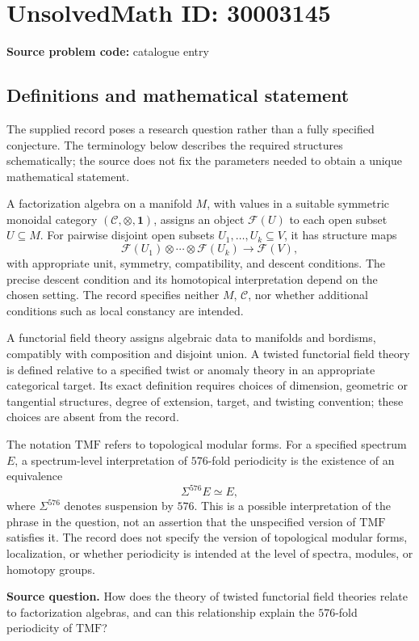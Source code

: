 \documentclass[11pt]{article}
\begin{document}
\section*{UnsolvedMath ID: 30003145}
\textbf{Source problem code:} catalogue entry
\subsection{Definitions and mathematical statement}
The supplied record poses a research question rather than a fully specified conjecture. The terminology below describes the required structures schematically; the source does not fix the parameters needed to obtain a unique mathematical statement.

A factorization algebra on a manifold \(M\), with values in a suitable symmetric monoidal category \((\mathcal C,\otimes,\mathbf 1)\), assigns an object \(\mathcal F(U)\) to each open subset \(U\subseteq M\). For pairwise disjoint open subsets \(U_1,\ldots,U_k\subseteq V\), it has structure maps
\[
\mathcal F(U_1)\otimes\cdots\otimes\mathcal F(U_k)\longrightarrow\mathcal F(V),
\]
with appropriate unit, symmetry, compatibility, and descent conditions. The precise descent condition and its homotopical interpretation depend on the chosen setting. The record specifies neither \(M\), \(\mathcal C\), nor whether additional conditions such as local constancy are intended.

A functorial field theory assigns algebraic data to manifolds and bordisms, compatibly with composition and disjoint union. A twisted functorial field theory is defined relative to a specified twist or anomaly theory in an appropriate categorical target. Its exact definition requires choices of dimension, geometric or tangential structures, degree of extension, target, and twisting convention; these choices are absent from the record.

The notation \(\mathrm{TMF}\) refers to topological modular forms. For a specified spectrum \(E\), a spectrum-level interpretation of \(576\)-fold periodicity is the existence of an equivalence
\[
\Sigma^{576}E\simeq E,
\]
where \(\Sigma^{576}\) denotes suspension by \(576\). This is a possible interpretation of the phrase in the question, not an assertion that the unspecified version of \(\mathrm{TMF}\) satisfies it. The record does not specify the version of topological modular forms, localization, or whether periodicity is intended at the level of spectra, modules, or homotopy groups.

\textbf{Source question.} How does the theory of twisted functorial field theories relate to factorization algebras, and can this relationship explain the \(576\)-fold periodicity of \(\mathrm{TMF}\)?
\end{document}
